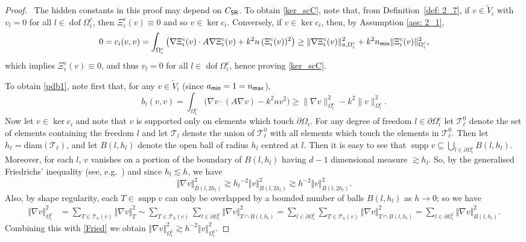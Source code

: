 \documentclass[numbers,webpdf,imaiai]{ima-authoring-template}%
\theoremstyle{thmstyletwo}%
\numberwithin{equation}{section}
\newcommand{\scT}{\mathcal{T}}
\newcommand{\wV}{\widetilde{V}}
\newcommand{\shapereg}{C_{\textup{\textsf{SR}}}}
\numberwithin{equation}{section}
\DeclareMathOperator{\supp}{supp}
\DeclareMathOperator{\dof}{dof}
\newcommand{\amin}{a_{\textup{\textsf{min}}}}
\newcommand{\nmin}{n_{\textup{\textsf{min}}}}
\newcommand{\nmax}{n_{\textup{\textsf{max}}}}
\begin{document}
{\begin{proof}\, 
The hidden constants in this proof may depend on $\shapereg$.
To obtain \eqref{ker_scC}, note that, from Definition~\ref{def: 2_7}, if $v \in \wV_i$ with $v_l = 0$ 
for all $l \in \dof \Omega_i^c$, then $\Xi_i^c(v) \equiv 0$ and so $v \in \ker c_i$. 
Conversely, if {$v \in \ker c_i$}, then, by Assumption \ref{ass: 2_1},
\[
	0 = c_i(v,v) 
	= \int_{\Omega_i^c} \left({\nabla} {\Xi_i^c}(v)\cdot A \nabla {\Xi_i^c}(v) + k^2 {n} \,{(\Xi_i^c(v))^2} \right)
	\ge {\Vert \nabla \Xi_i^c(v)\Vert_{a,\Omega_i^c}^2 + k^2 \nmin\Vert \Xi_i^c(v) \Vert_{\Omega_i^c}^2},
\]
which implies $\Xi_i^c(v)\equiv 0$, and thus  $v_l = 0$ for all $l \in \dof \Omega_i^c$, hence proving \eqref{ker_scC}.    

To obtain \eqref{pdb1}, note first that, for any $v \in \wV_i$ (since $\amin=1 = \nmax$), 
\begin{equation}     
	b_{i}(v,v)
	= \int_{\Omega_i^c} \bigl(\nabla v \cdot (A\nabla v) - k^2 {n} v^2\bigr) 
	\ge \|\nabla v\|_{\Omega_i^c}^2 - k^2 \|v\|_{\Omega_i^c}^2.  
	\label{iggeq1} 
\end{equation}
Now let $v \in \ker c_i$ and note that $v$ is supported only on elements which touch $\partial \Omega_i$.
For any degree of freedom $l \in \partial \Omega_i^c$ let $\mathcal{T}_\ell^0$ denote the set of elements containing the freedom $l$
and let $\mathcal{T}_l$ denote the union of $\mathcal{T}_\ell^0$ with all elements which touch the elements in $\mathcal{T}_\ell^0$. 
Then let $h_\ell = \mathrm{diam}(\mathcal{T}_\ell)$, and let $B(l,h_l)$ denote the open ball of radius $h_l$ centred at $l$. 
Then it is easy to see that $\supp v \subseteq \bigcup_{l\in \partial \Omega_i^c}  B(l,h_l)$.
Moreover, for each $l$, $v$ vanishes on a portion of the boundary of  $B(l,h_l)$ having $d-1$ dimensional measure $\gtrsim h_l$. 
So, by the generalised Friedrichs' inequality (see, e.g.\ \cite[Lemma~A.15]{Toselli:2005:DDM}) and since $h_l \lesssim  h$,
we have
\begin{equation} \label{Fried}
	\Vert \nabla v \Vert_{B(l,2h_l)}^2  \gtrsim  {h_{l}}^{-2} \Vert v \Vert_{B(l,2h_l)}^2 \gtrsim   {h}^{-2}
	\Vert v \Vert_{B(l,2h_l)}^2.
\end{equation}
Also, by shape regularity, each $T \in \supp v$ can only be overlapped by a bounded number of balls $B(l,h_l)$ as $h \rightarrow 0$; 
so we have
\begin{align*}
	\Vert \nabla v \Vert_{\Omega_i^c}^2  &= \sum_{T\in \scT_h(v)} \Vert \nabla v \Vert_{T}^2 
	\sim \sum_{T\in \scT_h(v)} \sum_{l \in \partial \Omega_i^c}\Vert \nabla v \Vert_{T\cap B(l,h_l)}^2 
	= \sum_{l \in \partial \Omega_i^c} \sum_{T\in \scT_h(v)} \Vert \nabla v \Vert_{T\cap B(l,h_l)}^2  
	= \sum_{l \in \partial \Omega_i^c}  \Vert \nabla v \Vert_{B(l,h_l)}^2.
\end{align*}
Combining this with \eqref{Fried} we obtain
$ \Vert \nabla v \Vert_{\Omega_i^c}^2 \gtrsim h^{-2} \Vert v \Vert_{\Omega_i^c}^2 $.


\end{proof}}
\end{document}
